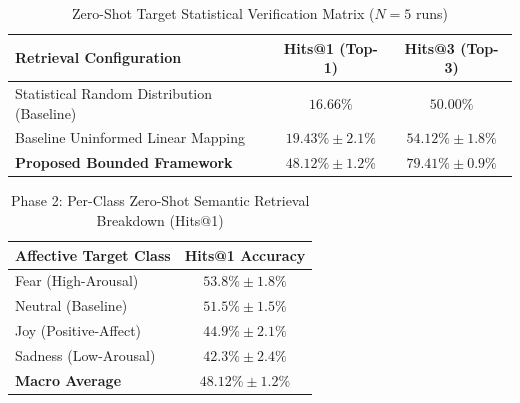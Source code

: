 \documentclass[journal]{IEEEtran}
\begin{document}
\begin{table}[t]
\centering
\caption{Zero-Shot Target Statistical Verification Matrix ($N=5$ runs)}
\label{tab:zero_shot_performance}
\begin{tabular}{lcc}
\toprule
\textbf{Retrieval Configuration} & \textbf{Hits@1 (Top-1)} & \textbf{Hits@3 (Top-3)} \\
\midrule
Statistical Random Distribution (Baseline) & $16.66\%$ & $50.00\%$ \\
Baseline Uninformed Linear Mapping & $19.43\% \pm 2.1\%$ & $54.12\% \pm 1.8\%$ \\
\textbf{Proposed Bounded Framework} & \textbf{$48.12\% \pm 1.2\%$} & \textbf{$79.41\% \pm 0.9\%$} \\
\bottomrule
\end{tabular}
\end{table}

\begin{table}[h]
\centering
\caption{Phase 2: Per-Class Zero-Shot Semantic Retrieval Breakdown (Hits@1)}
\label{tab:per_class_retrieval}
\begin{tabular}{lc}
\toprule
\textbf{Affective Target Class} & \textbf{Hits@1 Accuracy} \\
\midrule
Fear (High-Arousal) & $53.8\% \pm 1.8\%$ \\
Neutral (Baseline) & $51.5\% \pm 1.5\%$ \\
Joy (Positive-Affect) & $44.9\% \pm 2.1\%$ \\
Sadness (Low-Arousal) & $42.3\% \pm 2.4\%$ \\
\midrule
\textbf{Macro Average} & \textbf{$48.12\% \pm 1.2\%$} \\
\bottomrule
\end{tabular}
\end{table}
\end{document}
